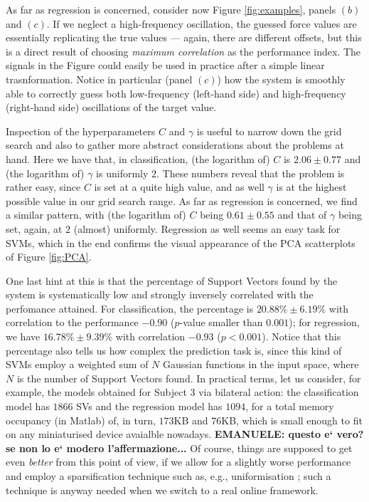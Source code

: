 As far as regression is concerned, consider now Figure
\ref{fig:examples}, panels $(b)$ and $(c)$. If we neglect a
high-frequency oscillation, the guessed force values are essentially
replicating the true values --- again, there are different offsets,
but this is a direct result of choosing \emph{maximum correlation} as
the performance index. The signals in the Figure could easily be used
in practice after a simple linear trasnformation. Notice in particular
(panel $(c)$) how the system is smoothly able to correctly guess both
low-frequency (left-hand side) and high-frequency (right-hand side)
oscillations of the target value.

Inspection of the hyperparameters $C$ and $\gamma$ is useful to narrow
down the grid search and also to gather more abstract considerations
about the problems at hand. Here we have that, in classification, (the
logarithm of) $C$ is $2.06 \pm 0.77$ and (the logarithm of) $\gamma$
is uniformly $2$. These numbers reveal that the problem is rather
easy, since $C$ is set at a quite high value, and as well $\gamma$ is at
the highest possible value in our grid search range. As far as
regression is concerned, we find a similar pattern, with (the
logarithm of) $C$ being $0.61 \pm 0.55$ and that of $\gamma$ being
set, again, at $2$ (almost) uniformly. Regression as well seems an
easy task for SVMs, which in the end confirms the visual appearance of
the PCA scatterplots of Figure \ref{fig:PCA}.

One last hint at this is that the percentage of Support Vectors found
by the system is systematically low and strongly inversely correlated
with the perfomance attained. For classification, the percentage is
$20.88\% \pm 6.19\%$ with correlation to the performance $-0.90$
($p$-value smaller than $0.001$); for regression, we have $16.78\% \pm
9.39\%$ with correlation $-0.93$ ($p<0.001$). Notice that this
percentage also tells us how complex the prediction task is, since
this kind of SVMs employ a weighted sum of $N$ Gaussian functions in
the input space, where $N$ is the number of Support Vectors found. In
practical terms, let us consider, for example, the models obtained for
Subject $3$ via bilateral action: the classification model has $1866$
SVs and the regression model has $1094$, for a total memory occupancy
(in Matlab) of, in turn, $173$KB and $76$KB, which is small enough to
fit on any miniaturised device avaialble nowadays. \textbf{EMANUELE:
questo e` vero? se non lo e` modero l'affermazione...} Of course,
things are supposed to get even \emph{better} from this point of view,
if we allow for a slightly worse performance and employ a
sparsification technique such as, e.g., uniformisation
\cite{2008.ICRA,2008.BioCyb}; such a technique is anyway needed when
we switch to a real online framework.
